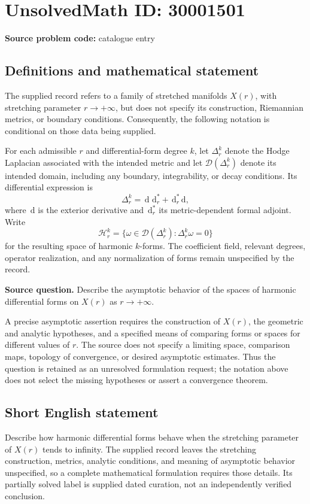 \documentclass[11pt]{article}
\newcommand{\dd}{\,\mathrm{d}}
\begin{document}
\section*{UnsolvedMath ID: 30001501}
\textbf{Source problem code:} catalogue entry
\subsection{Definitions and mathematical statement}
The supplied record refers to a family of stretched manifolds \(X(r)\), with stretching parameter \(r\to+\infty\), but does not specify its construction, Riemannian metrics, or boundary conditions. Consequently, the following notation is conditional on those data being supplied.

For each admissible \(r\) and differential-form degree \(k\), let \(\Delta_r^k\) denote the Hodge Laplacian associated with the intended metric and let \(\mathcal D(\Delta_r^k)\) denote its intended domain, including any boundary, integrability, or decay conditions. Its differential expression is
\[
\Delta_r^k=\dd\,\dd_r^*+\dd_r^*\dd,
\]
where \(\dd\) is the exterior derivative and \(\dd_r^*\) its metric-dependent formal adjoint. Write
\[
\mathcal H_r^k
=\{\omega\in\mathcal D(\Delta_r^k):\Delta_r^k\omega=0\}
\]
for the resulting space of harmonic \(k\)-forms. The coefficient field, relevant degrees, operator realization, and any normalization of forms remain unspecified by the record.

\textbf{Source question.} Describe the asymptotic behavior of the spaces of harmonic differential forms on \(X(r)\) as \(r\to+\infty\).

A precise asymptotic assertion requires the construction of \(X(r)\), the geometric and analytic hypotheses, and a specified means of comparing forms or spaces for different values of \(r\). The source does not specify a limiting space, comparison maps, topology of convergence, or desired asymptotic estimates. Thus the question is retained as an unresolved formulation request; the notation above does not select the missing hypotheses or assert a convergence theorem.
\subsection{Short English statement}
Describe how harmonic differential forms behave when the stretching parameter of \(X(r)\) tends to infinity. The supplied record leaves the stretching construction, metrics, analytic conditions, and meaning of asymptotic behavior unspecified, so a complete mathematical formulation requires those details. Its partially solved label is supplied dated curation, not an independently verified conclusion.
\end{document}
